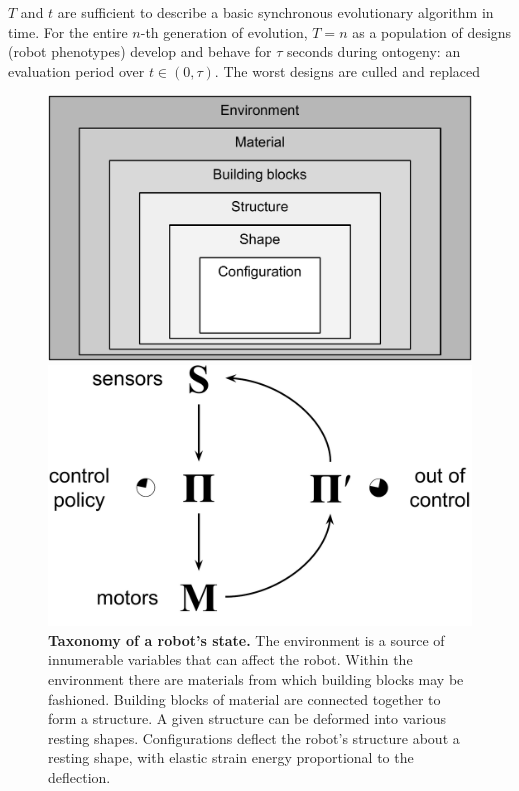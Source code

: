 \begin{enumerate}
    $T$ and $t$ are sufficient to describe a basic synchronous evolutionary algorithm in time.
    For the entire $n$-th generation of evolution, $T=n$ as a population of designs (robot phenotypes)
    develop and behave for $\tau$ seconds during ontogeny: an evaluation period over $t\in(0, \tau)$.
    The worst designs are culled and replaced 
    \begin{figure}[H]
    \begin{minipage}[t]{0.47\linewidth}
        \centering
        \includegraphics[width=\linewidth]{fig/taxonomy}
        \caption{\label{fig:taxonomy}\textbf{Taxonomy of a robot's state.} 
        The environment is a source of innumerable variables that can affect the robot.
        Within the environment there are materials from which building blocks may be fashioned.
        Building blocks of material are connected together to form a structure.
        A given structure can be deformed into various resting shapes.
        Configurations deflect the robot's structure about a resting shape, with elastic strain energy proportional to the deflection.
        }
    \end{minipage}
    \hfill
    \begin{minipage}[t]{0.47\linewidth}
        \centering
        \includegraphics[width=\linewidth]{fig/sensor-policy-motor.pdf}

\end{minipage}
\end{figure}
\end{enumerate}
